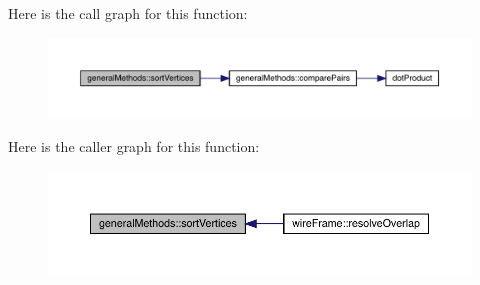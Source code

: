 Here is the call graph for this function\+:
\nopagebreak
\begin{figure}[H]
\begin{center}
\leavevmode
\includegraphics[width=350pt]{namespacegeneral_methods_ace3487740f3b46dce9e0357366abf9ed_cgraph}
\end{center}
\end{figure}
Here is the caller graph for this function\+:
\nopagebreak
\begin{figure}[H]
\begin{center}
\leavevmode
\includegraphics[width=350pt]{namespacegeneral_methods_ace3487740f3b46dce9e0357366abf9ed_icgraph}
\end{center}
\end{figure}
